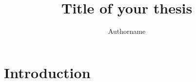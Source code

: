 \documentclass[department=cse,degree=phd,book=synopsis,backref=page,spacing=single]{iiththesis}
\title{Title of your thesis}
\author{Authorname}
\begin{document}
\section*{Introduction}

\clearpage
\newpage


\end{document}
